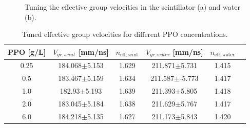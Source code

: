 \begin{figure}[htbp]
		\caption[Tuning the effective group velocities in the scintillator and water.]{Tuning the effective group velocities in the scintillator (a) and water (b).\label{fig:scint_groupVelocity}}
\end{figure}

\begin{table}[ht]
	\centering
	\caption{\label{partial_groupV}Tuned effective group velocities for different PPO concentrations.}	
	{\centering
		\begin{tabular*}{140mm}{c@{\extracolsep{\fill}}ccccc}
			\toprule 
			PPO [g/L] & $V_{gr,scint}$ [mm/ns]& $n_\mathrm{eff,scint}$ & $V_{gr,water}$ [mm/ns]& $n_\mathrm{eff,water}$\\
			\midrule
			0.25 & 184.068$\pm$5.153 & 1.629 & 211.871$\pm$5.731 & 1.415\\
			0.5  & 183.467$\pm$5.159 &1.634& 211.587$\pm$-5.773 & 1.417 \\
			1.0 & 182.93$\pm$5.193 &1.639& 211.393$\pm$5.805& 1.418 \\
			2.0 & 183.045$\pm$5.184& 1.638& 211.629$\pm$5.767 & 1.417	\\
			6.0 & 184.218$\pm$5.135& 1.627& 211.173$\pm$5.843 &1.420\\
			\bottomrule	
		\end{tabular*}
	}
\end{table}

